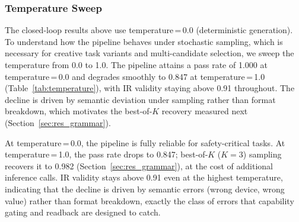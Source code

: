 \documentclass[a4paper,fleqn,longmktitle]{cas-dc}
\begin{document}
\subsubsection{Temperature Sweep}
\label{sec:res_temperature}

The closed-loop results above use temperature\,=\,0.0 (deterministic generation). To understand how the pipeline behaves under stochastic sampling, which is necessary for creative task variants and multi-candidate selection, we sweep the temperature from 0.0 to 1.0. The pipeline attains a pass rate of 1.000 at temperature\,=\,0.0 and degrades smoothly to 0.847 at temperature\,=\,1.0 (Table~\ref{tab:temperature}), with IR validity staying above 0.91 throughout. The decline is driven by semantic deviation under sampling rather than format breakdown, which motivates the best-of-$K$ recovery measured next (Section~\ref{sec:res_grammar}).

At temperature\,=\,0.0, the pipeline is fully reliable for safety-critical tasks. At temperature\,=\,1.0, the pass rate drops to 0.847; best-of-$K$ ($K{=}3$) sampling recovers it to 0.982 (Section~\ref{sec:res_grammar}), at the cost of additional inference calls. IR validity stays above 0.91 even at the highest temperature, indicating that the decline is driven by semantic errors (wrong device, wrong value) rather than format breakdown, exactly the class of errors that capability gating and readback are designed to catch.

\begin{table}[t]
\centering
\caption{Temperature sweep results (6 temperature points, 339 trials each, 95\% Wilson CIs). Each trial is an independent LLM generation on one of 113 tasks.}
\label{tab:temperature}
\footnotesize
{}
\end{table}
\end{document}

